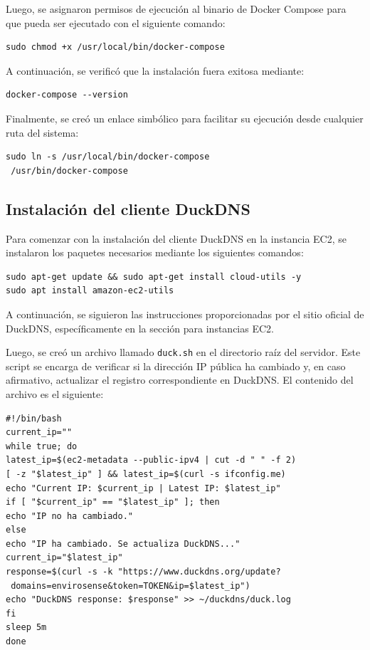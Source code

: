 Luego, se asignaron permisos de ejecución al binario de Docker Compose para que
pueda ser ejecutado con el siguiente comando:

\begin{verbatim}
sudo chmod +x /usr/local/bin/docker-compose
\end{verbatim}

A continuación, se verificó que la instalación fuera exitosa mediante:

\begin{verbatim}
docker-compose --version
\end{verbatim}

Finalmente, se creó un enlace simbólico para facilitar su ejecución desde
cualquier ruta del sistema:

\begin{verbatim}
sudo ln -s /usr/local/bin/docker-compose 
 /usr/bin/docker-compose
\end{verbatim}

\subsection{Instalación del cliente DuckDNS}

Para comenzar con la instalación del cliente DuckDNS en la instancia EC2, se
instalaron los paquetes necesarios mediante los siguientes comandos:

\begin{verbatim}
sudo apt-get update && sudo apt-get install cloud-utils -y
sudo apt install amazon-ec2-utils
\end{verbatim}

A continuación, se siguieron las instrucciones proporcionadas por el sitio
oficial de DuckDNS, específicamente en la sección para instancias EC2.

Luego, se creó un archivo llamado \texttt{duck.sh} en el directorio raíz del
servidor. Este script se encarga de verificar si la dirección IP pública ha
cambiado y, en caso afirmativo, actualizar el registro correspondiente en
DuckDNS. El contenido del archivo es el siguiente:

\begin{verbatim}
#!/bin/bash
current_ip=""
while true; do
latest_ip=$(ec2-metadata --public-ipv4 | cut -d " " -f 2)
[ -z "$latest_ip" ] && latest_ip=$(curl -s ifconfig.me)
echo "Current IP: $current_ip | Latest IP: $latest_ip"
if [ "$current_ip" == "$latest_ip" ]; then
echo "IP no ha cambiado."
else
echo "IP ha cambiado. Se actualiza DuckDNS..."
current_ip="$latest_ip"
response=$(curl -s -k "https://www.duckdns.org/update?
 domains=envirosense&token=TOKEN&ip=$latest_ip")
echo "DuckDNS response: $response" >> ~/duckdns/duck.log
fi
sleep 5m
done
\end{verbatim}

